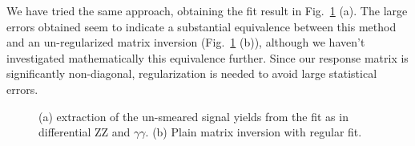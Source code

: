 We have tried the same approach, obtaining the fit result in
Fig.~\ref{fig:embedded_unfolding} (a). The large errors obtained seem to
indicate a substantial equivalence between this method and an un-regularized
matrix inversion (Fig.~\ref{fig:embedded_unfolding} (b)), although we haven't
investigated mathematically this equivalence further. Since our response
matrix is significantly non-diagonal, regularization is needed to avoid large
statistical errors.

\begin{figure}[htb]
\centering
{}
\caption{(a) extraction of the un-smeared signal yields from the fit as in
differential ZZ and $\gamma\gamma$. (b) Plain matrix inversion with regular
fit.\label{fig:embedded_unfolding}}
\end{figure}



